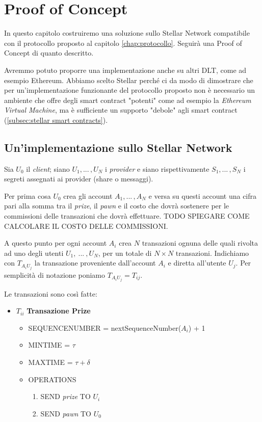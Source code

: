 \chapter{Proof of Concept}

In questo capitolo costruiremo una soluzione sullo Stellar Network
compatibile con il protocollo proposto al capitolo \ref{chap:protocollo}.
Seguirà una Proof of Concept di quanto descritto.

Avremmo potuto proporre una
implementazione anche su altri DLT, come ad esempio Ethereum. Abbiamo scelto
Stellar perché ci da modo di dimostrare che per un'implementazione funzionante
del protocollo proposto non è necessario un ambiente che
offre degli smart contract "potenti" come ad esempio
la \textit{Ethereum Virtual Machine},
ma è sufficiente un supporto
"debole" agli smart contract (\ref{subsec:stellar smart contracts}).


\section{Un'implementazione sullo Stellar Network}
Sia $ U_0 $ il \textit{client};
siano $ U_1, ...\, , U_N $ i \textit{provider} e
siano rispettivamente $ S_1, ...\, , S_N $ i segreti assegnati ai provider
(share o messaggi).

Per prima cosa $ U_0 $ crea gli account $ A_1, ...\, , A_N $ e
versa su questi account una cifra pari alla somma tra
il \textit{prize}, il \textit{pawn} e il costo che dovrà sostenere per le commissioni
delle transazioni che dovrà effettuare.
TODO SPIEGARE COME CALCOLARE IL COSTO DELLE COMMISSIONI.

A questo punto per ogni account $ A_i $ crea $ N $ transazioni
ognuna delle quali rivolta ad uno degli utenti $ U_1,\ ...\ , U_N $, per un totale
di $ N \times N $ transazioni. Indichiamo con $ T_{{A_i}{U_j}} $ la transazione
proveniente dall'account $ A_i $ e diretta all'utente $ U_j $.
Per semplicità di notazione poniamo $ T_{{A_i}{U_j}} = T_{ij} $.

Le transazioni sono così fatte:
\begin{itemize}
	\item $T_{ii} $ \textbf{Transazione Prize}
	      \begin{itemize}
		      \item SEQUENCE\textunderscore NUMBER = nextSequenceNumber($ A_i $) + 1
		      \item MIN\textunderscore TIME = $ \tau $
		      \item MAX\textunderscore TIME = $ \tau + \delta $
		      \item OPERATIONS
		            \begin{enumerate}
			            \item SEND \textit{prize} TO $ U_i $
			            \item SEND \textit{pawn} TO $ U_0 $
		            \end{enumerate}
	      \end{itemize}
\end{itemize}

